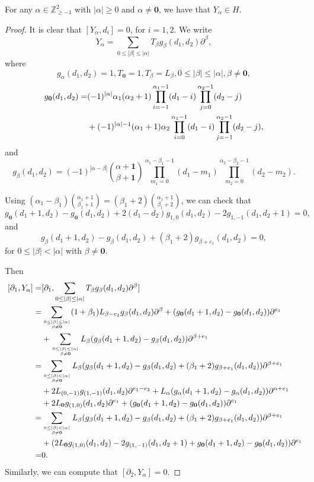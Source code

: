 \documentclass[10pt,a4paper]{amsart}
\def\Z{\mathbb{Z}}
\def\a{\alpha}
\def\be{\beta}
\def\p{\partial}
\begin{document}
\begin{Lemma}\label{H-generator}For any $\a\in \Z_{\geq-1}^2$ with $|\a|\geq0$ and $\a\neq\mathbf{0}$,  we have that  $Y_{\a}\in H$.
\end{Lemma}

\begin{proof}
It is clear that $[Y_\a,d_i]=0$, for $i=1,2$.
We write
$$Y_\a=\sum_{0\leq|\be|\leq|\a|} T_\be g_\be(d_1,d_2)\p^{\be},$$ where
$$g_\a(d_1,d_2)=1,T_\mathbf{0}=1,T_\be=L_\be,0\leq|\be|\leq|\a|,\be\neq\mathbf{0},$$
$$ \aligned g_\mathbf{0}(d_1,d_2)=&(-1)^{|\a|}\a_1(\a_2+1)\prod_{i=-1}^{\a_1-1}(d_1-i)
\prod_{j=0}^{\a_2-1}(d_2-j)\\
&+(-1)^{|\a|-1}(\a_1+1)\a_2\prod_{i=0}^{\a_1-1}(d_1-i)\prod_{j=-1}^{\a_2-1}(d_2-j), \endaligned$$
and $$g_\be(d_1,d_2)=(-1)^{|\a-\be|}
\binom{\a+\mathbf{1}}{\be+\mathbf{1}}
\prod_{m_1=0}^{\a_1-\be_1-1}(d_1-m_1)
\prod_{m_2=0}^{\a_2-\be_2-1}(d_2-m_2).$$

Using $(\a_1-\be_1)\binom{\a_1+1}{\be_1+1}=(\be_1+2)\binom{\a_1+1}{\be_1+2}$, we can check that
 $$g_{\mathbf{0}}(d_1+1,d_2)-g_{\mathbf{0}}(d_1,d_2)
 +2(d_1-d_2)g_{1,0}(d_1,d_2)-2g_{1,-1}(d_1,d_2+1)=0, $$
and $$g_{\be}(d_1+1,d_2)-g_{\be}(d_1,d_2)+(\be_1+2)g_{\be+e_1}(d_1,d_2)=0,$$ for $0\leq|\be|<|\a|$ with $\be\neq\mathbf{0}$.

Then
$$\aligned \
[\p_1,Y_{\a}]=&[\p_1,\sum_{0\leq|\be|\leq|\a|} T_\be g_\be(d_1,d_2)\p^{\be}]\\
=&\sum_{0\leq|\be|\leq|\a|\atop \be\neq\mathbf{0}}(1+\be_1)L_{\be-e_1} g_\be(d_1,d_2)\p^{\be}
+(g_\mathbf{0}(d_1+1,d_2)-g_\mathbf{0}(d_1,d_2))\p^{e_1}\\
&+\sum_{0\leq |\be| \leq |\a|\atop \be\neq\mathbf{0}} L_\be(g_\be(d_1+1,d_2)-g_\be(d_1,d_2))\p^{\be+e_1}\\
=&\sum_{0\leq|\be|<|\a|\atop \be\neq\mathbf{0}}L_\be(g_{\be}(d_1+1,d_2)-g_{\be}(d_1,d_2)
+(\be_1+2)g_{\be+e_1}(d_1,d_2))\p^{\be+e_1}\\
&+2L_{(0,-1)}g_{(1,-1)}(d_1,d_2)\p^{e_1-e_2}+L_\a(g_\a(d_1+1,d_2)-g_\a(d_1,d_2))\p^{\a+e_1}\\
&+2L_{\mathbf{0}} g_{(1,0)}(d_1,d_2)\p^{e_1}
+(g_\mathbf{0}(d_1+1,d_2)-g_\mathbf{0}(d_1,d_2))\p^{e_1}\\
=&\sum_{0\leq|\be|<|\a|\atop \be\neq\mathbf{0}}L_\be(g_{\be}(d_1+1,d_2)-g_{\be}(d_1,d_2)
+(\be_1+2)g_{\be+e_1}(d_1,d_2))\p^{\be+e_1}\\
&+(2L_{\mathbf{0}} g_{(1,0)}(d_1,d_2)-2g_{(1,-1)}(d_1,d_2+1)
+g_\mathbf{0}(d_1+1,d_2)-g_\mathbf{0}(d_1,d_2))\p^{e_1}\\
=&0.
\endaligned$$
Similarly, we can compute that $[\p_2,Y_\a]=0$.
\end{proof}
\end{document}
